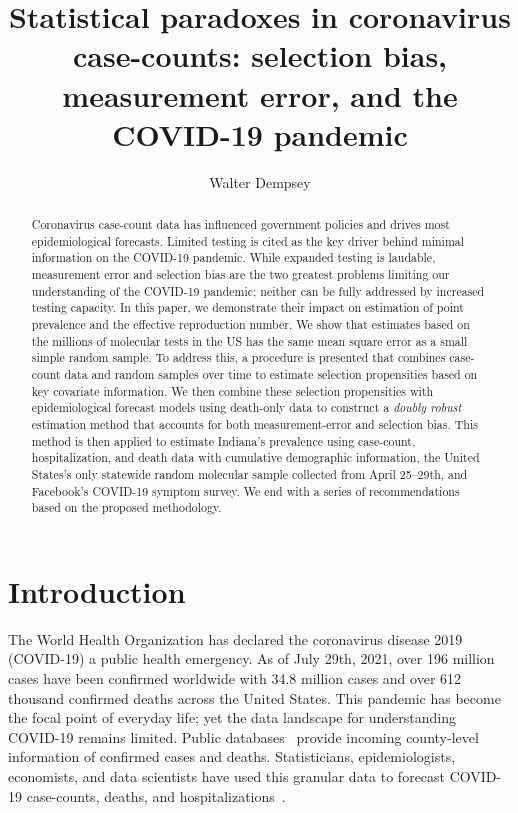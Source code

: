 \documentclass[11pt]{amsart}
\numberwithin{equation}{section}
\theoremstyle{plain}
\begin{document}
\title[Statistical paradoxes in coronavirus case-counts]{Statistical paradoxes in coronavirus case-counts: selection bias, measurement error, and the COVID-19 pandemic} %

\author{Walter Dempsey}
\address{Department of Biostatistics, University of Michigan, Ann Arbor, MI 48109}

\begin{abstract}
  Coronavirus case-count data has influenced government policies and drives most epidemiological forecasts. Limited testing is cited as the key driver behind minimal information on the COVID-19 pandemic. While expanded testing is laudable, measurement error and selection bias are the two greatest problems limiting our understanding of the COVID-19 pandemic; neither can be fully addressed by increased testing capacity. In this paper, we demonstrate their impact on estimation of point prevalence and the effective reproduction number. We show that estimates based on the millions of molecular tests in the US has the same mean square error as a small simple random sample.  To address this, a procedure is presented that combines case-count data and random samples over time to estimate selection propensities based on key covariate information. We then combine these selection propensities with epidemiological forecast models using death-only data to construct a \emph{doubly robust} estimation method that accounts for both measurement-error and selection bias.  This method is then applied to estimate Indiana's prevalence using case-count, hospitalization, and death data with cumulative demographic information, the United States's only statewide random molecular sample collected from April 25--29th, and Facebook's COVID-19 symptom survey.  We end with a series of recommendations based on the proposed methodology.
\end{abstract}

\maketitle

\newpage


\section{Introduction}
The World Health Organization has declared the coronavirus disease 2019 (COVID-19) a public health emergency.  As of July 29th, 2021, over 196 million cases have been confirmed worldwide with 34.8 million cases and over 612 thousand confirmed deaths across the United States. This pandemic
has become the focal point of everyday life; yet the data landscape for understanding COVID-19 remains limited.  Public databases~\citep{JHU_Lancet,NYT} provide incoming county-level information of confirmed cases and deaths.  Statisticians, epidemiologists, economists, and data scientists have used this granular data to forecast COVID-19 case-counts, deaths, and hospitalizations~\citep{Giordano2020,Song2020,Ray2020,2020.IHME,Wang2020.03,JTD36385}.
\end{document}
